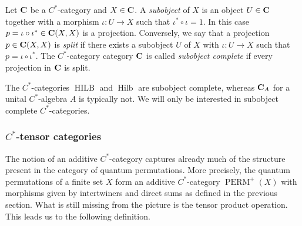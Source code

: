\documentclass[a4paper]{amsart}
\newcommand*{\BC}{{\bf C}}
\DeclareMathOperator{\Hilb}{Hilb}
\DeclareMathOperator{\HILB}{HILB}
\DeclareMathOperator{\PERM}{PERM}
\numberwithin{equation}{section}
\theoremstyle{change}
\begin{document}
Let $ \BC $ be a $ C^* $-category and $ X \in \BC $. A \emph{subobject} of $ X $ is an object $ U \in \BC $ together with a 
morphism $ \iota: U \rightarrow X $ such that $ \iota^* \circ \iota = 1 $. In this case $ p = \iota \circ \iota^* \in \BC(X,X) $ is a projection.
Conversely, we say that a projection $ p \in \BC(X,X) $ is \emph{split} if there exists a subobject $ U $ of $ X $ with $ \iota: U \rightarrow X $ 
such that $ p = \iota \circ \iota^* $. The $ C^* $-category category $ \BC $ is called \emph{subobject complete} if every projection in $ \BC $ is split. 

The $ C^* $-categories $ \HILB $ and $ \Hilb $ are subobject complete, whereas $ \BC_A $ for a unital $ C^* $-algebra $ A $ is typically not. We will only be interested in subobject complete $ C^* $-categories. 

\subsubsection{$ C^* $-tensor categories} 

The notion of an additive $ C^* $-category captures already much of the structure present in the category of quantum permutations. More precisely, the quantum permutations of a finite set $ X $ form an additive $ C^* $-category $ \PERM^+(X) $ with morphisms given by intertwiners and direct sums as defined in the previous section. What is still missing from the picture is the tensor product operation. This leads us to the following definition. 
\end{document}
